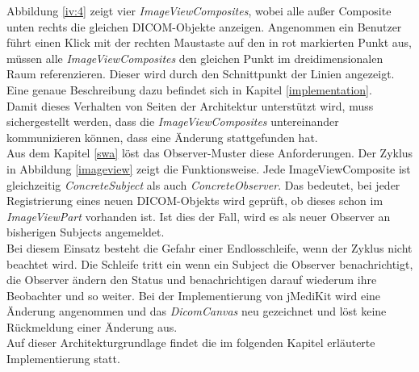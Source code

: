 Abbildung \ref{iv:4} zeigt vier \textit{ImageViewComposites}, wobei alle außer Composite unten rechts die gleichen DICOM-Objekte anzeigen.
Angenommen ein Benutzer führt einen Klick mit der rechten Maustaste auf den in rot markierten Punkt aus, müssen alle \textit{ImageViewComposites} den gleichen Punkt im dreidimensionalen Raum referenzieren. Dieser wird durch den Schnittpunkt der Linien angezeigt. Eine genaue Beschreibung dazu befindet sich in Kapitel \ref{implementation}.\\
Damit dieses Verhalten von Seiten der Architektur unterstützt wird, muss sichergestellt werden, dass die \textit{ImageViewComposites} untereinander kommunizieren können, dass eine Änderung stattgefunden hat.\\
Aus dem Kapitel \ref{swa} löst das Observer-Muster diese Anforderungen. Der Zyklus in Abbildung \ref{imageview} zeigt die Funktionsweise. Jede ImageViewComposite ist gleichzeitig \textit{ConcreteSubject} als auch \textit{ConcreteObserver}. Das bedeutet, bei jeder Registrierung eines neuen DICOM-Objekts wird geprüft, ob dieses schon im \textit{ImageViewPart} vorhanden ist. Ist dies der Fall, wird es als neuer Observer an bisherigen Subjects angemeldet.\\
Bei diesem Einsatz besteht die Gefahr einer Endlosschleife, wenn der Zyklus nicht beachtet wird. Die Schleife tritt ein wenn ein Subject die Observer benachrichtigt, die Observer ändern den Status und benachrichtigen darauf wiederum ihre Beobachter und so weiter. Bei der Implementierung von jMediKit wird eine Änderung angenommen und das \textit{DicomCanvas} neu gezeichnet und löst keine Rückmeldung einer Änderung aus. \\
Auf dieser Architekturgrundlage findet die im folgenden Kapitel erläuterte Implementierung statt.
